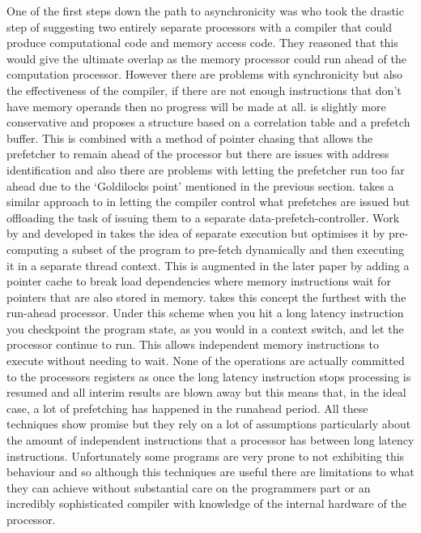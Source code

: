 One of the first steps down the path to asynchronicity was \citet{veidenbaumDecoupledAccessDRAM1997} who took the drastic step of suggesting two entirely separate processors with a compiler that could produce computational code and memory access code. They reasoned that this would give the ultimate overlap as the memory processor could run ahead of the computation processor. However there are problems with synchronicity but also the effectiveness of the compiler, if there are not enough instructions that don't have memory operands then no progress will be made at all. \citet{rothDependenceBasedPrefetching1998} is slightly more conservative and proposes a structure based on a correlation table and a prefetch buffer. This is combined with a method of pointer chasing that allows the prefetcher to remain ahead of the processor but there are issues with address identification and also there are problems with letting the prefetcher run too far ahead due to the `Goldilocks point' mentioned in the previous section. \citet{vanderwielCompilerassistedDataPrefetch1999} takes a similar approach to \citeauthor{veidenbaumDecoupledAccessDRAM1997} in letting the compiler control what prefetches are issued but offloading the task of issuing them to a separate data-prefetch-controller. Work by \citet{collinsDynamicSpeculativePrecomputation2001} and developed in \citeyear{collinsPointerCacheAssisted2002}\cite{collinsPointerCacheAssisted2002} takes the idea of separate execution but optimises it by pre-computing a subset of the program to pre-fetch dynamically and then executing it in a separate thread context. This is augmented in the later paper by adding a pointer cache to break load dependencies where memory instructions wait for pointers that are also stored in memory. \citet{mutluRunaheadExecutionAlternative2003, mutluRunaheadExecutionEffective2003} takes this concept the furthest with the run-ahead processor. Under this scheme when you hit a long latency instruction you checkpoint the program state, as you would in a context switch, and let the processor continue to run. This allows independent memory instructions to execute without needing to wait. None of the operations are actually committed to the processors registers as once the long latency instruction stops processing is resumed and all interim results are blown away but this means that, in the ideal case, a lot of prefetching has happened in the runahead period. All these techniques show promise but they rely on a lot of assumptions particularly about the amount of independent instructions that a processor has between long latency instructions. Unfortunately some programs are very prone to not exhibiting this behaviour and so although this techniques are useful there are limitations to what they can achieve without substantial care on the programmers part or an incredibly sophisticated compiler with knowledge of the internal hardware of the processor.

